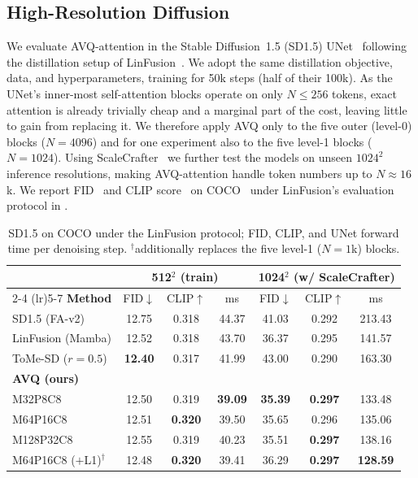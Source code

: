 \subsection{High-Resolution Diffusion}
\label{sec:exp_diffusion}
We evaluate AVQ-attention in the Stable Diffusion~1.5 (SD1.5) UNet~\cite{rombach2022ldm} following the distillation setup of LinFusion~\cite{liu2024linfusion}. We adopt the same distillation objective, data, and hyperparameters, training for 50k steps (half of their 100k). As the UNet's inner-most self-attention blocks operate on only $N{\le}256$ tokens, exact attention is already trivially cheap and a marginal part of the cost, leaving little to gain from replacing it. We therefore apply AVQ only to the five outer (level-0) blocks ($N{=}4096$) and for one experiment also to the five level-1 blocks ($N{=}1024$).
Using ScaleCrafter~\cite{he2024scalecrafter} we further test the models on unseen $1024^2$ inference resolutions, making AVQ-attention handle token numbers up to $N{\approx}16$k. 
We report FID~\cite{heusel2017fid} and CLIP score~\cite{radford2021clip} on COCO~\cite{lin2014coco} under LinFusion's evaluation protocol in .
\begin{table}[t!]
\centering
\footnotesize
\setlength{\tabcolsep}{4pt}
\caption{SD1.5 on COCO under the LinFusion protocol; FID, CLIP, and UNet forward time per denoising step. $^\dagger$additionally replaces the five level-1 ($N{=}1$k) blocks.}
\label{tab:sd_baselines}
\begin{tabular}{lcccccc}
\toprule
 & \multicolumn{3}{c}{\textbf{512$^2$} (train)} & \multicolumn{3}{c}{\textbf{1024$^2$} (w/ ScaleCrafter)} \\
\cmidrule(lr){2-4} \cmidrule(lr){5-7}
\textbf{Method} & FID$\downarrow$ & CLIP$\uparrow$ & ms & FID$\downarrow$ & CLIP$\uparrow$ & ms \\
\midrule
SD1.5 (FA-v2)             & 12.75 & 0.318 & 44.37 & 41.03 & 0.292 & 213.43 \\
LinFusion (Mamba)         & 12.52 & 0.318 & 43.70 & 36.37 & 0.295 & 141.57 \\
ToMe-SD ($r{=}0.5$)       & \textbf{12.40} & 0.317 & 41.99 & 43.00 & 0.290 & 163.30 \\
\midrule
\multicolumn{7}{l}{\textbf{AVQ (ours)}} \\
\quad M32P8C8             & 12.50 & 0.319 & \textbf{39.09} & \textbf{35.39} & \textbf{0.297} & 133.48 \\
\quad M64P16C8            & 12.51 & \textbf{0.320} & 39.50 & 35.65 & 0.296 & 135.06 \\
\quad M128P32C8           & 12.55 & 0.319 & 40.23 & 35.51 & \textbf{0.297} & 138.16 \\
\quad M64P16C8 ($+$L1)$^\dagger$ & 12.48 & \textbf{0.320} & 39.41 & 36.29 & \textbf{0.297} & \textbf{128.59} \\
\bottomrule
\end{tabular}
\end{table}
\vspace{-1.25em}

